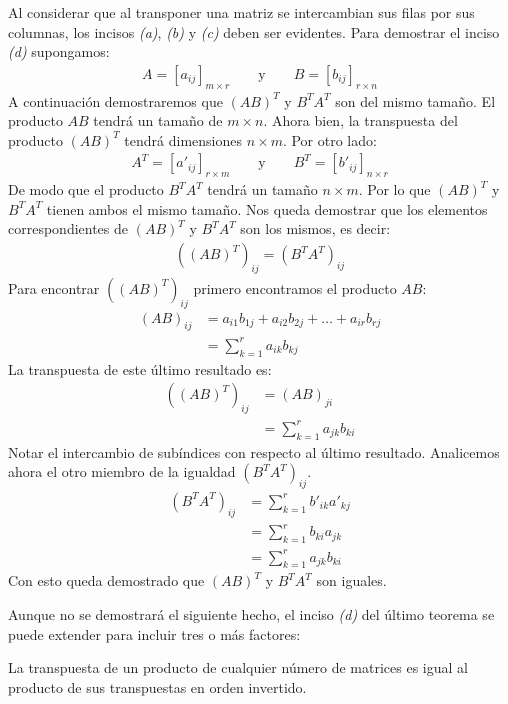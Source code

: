 \documentclass[a4paper,12pt]{article}
\begin{document}
\demo Al considerar que al transponer una matriz se intercambian sus filas por
sus columnas, los incisos \emph{(a)}, \emph{(b)} y \emph{(c)} deben ser
evidentes. Para demostrar el inciso \emph{(d)} supongamos:
\begin{align*}
  A=\left[ a_{ij} \right]_{m\times r} \qquad \mbox{y} \qquad B=\left[ b_{ij} \right]_{r\times n}
\end{align*}
A continuación demostraremos que $(AB)^T$ y $B^TA^T$ son del mismo tamaño. El
producto $AB$ tendrá un tamaño de $m\times n$. Ahora bien, la transpuesta del
producto $(AB)^T$ tendrá dimensiones $n\times m$. Por otro lado:
\begin{align*}
  A^T=\left[ a'_{ij} \right]_{r\times m} \qquad \mbox{y} \qquad B^T=\left[ b'_{ij} \right]_{n\times r}
\end{align*}
De modo que el producto $B^TA^T$ tendrá un tamaño $n\times m$. Por lo que
$(AB)^T$ y $B^TA^T$ tienen ambos el mismo tamaño.
Nos queda demostrar que los elementos correspondientes de $(AB)^T$ y $B^TA^T$
son los mismos, es decir:
\begin{align*}
  \left( (AB)^T \right)_{ij} = \left( B^TA^T \right)_{ij}
\end{align*}
Para encontrar $\left( (AB)^T \right)_{ij}$ primero encontramos el producto
$AB$:
\begin{align*}
  (AB)_{ij}&= a_{i1}b_{1j}+a_{i2}b_{2j}+\ldots+a_{ir}b_{rj} \\
  &= \sum_{k=1}^r a_{ik}b_{kj}
\end{align*}
La transpuesta de este último resultado es:
\begin{align*}
  \left( (AB)^T \right)_{ij} &= (AB)_{ji} \\
  &= \sum_{k=1}^r a_{jk}b_{ki}
\end{align*}
Notar el intercambio de subíndices con respecto al último resultado.
Analicemos ahora el otro miembro de la igualdad $\left( B^TA^T \right)_{ij}$.
\begin{align*}
  \left( B^TA^T \right)_{ij} &= \sum_{k=1}^r b'_{ik}a'_{kj} \\
  &= \sum_{k=1}^r b_{ki}a_{jk} \\
  &= \sum_{k=1}^r a_{jk}b_{ki}
\end{align*}
Con esto queda demostrado que $(AB)^T$ y $B^TA^T$ son iguales.

Aunque no se demostrará el siguiente hecho, el inciso \emph{(d)} del último
teorema se puede extender para incluir tres o más factores:
\begin{concept}[i]
  La transpuesta de un producto de cualquier número de matrices es igual al
  producto de sus transpuestas en orden invertido.
\end{concept}
\end{document}
